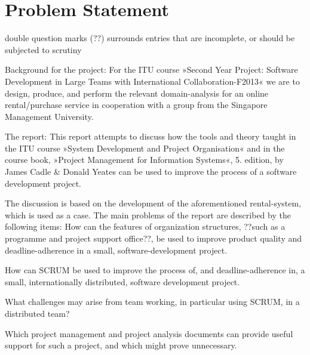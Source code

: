 \section{Problem Statement}
\label{sec:problemstatement}
double question marks (??) surrounds entries that are incomplete, or should be
subjected to scrutiny

Background for the project:
For the ITU course »Second Year Project: Software Development in Large Teams with
International Collaboration-F2013«
we are to design, produce, and perform the relevant domain-analysis for
an online rental/purchase service in cooperation with a group from the Singapore
Management University.

The report:
This report attempts to discuss how the tools and theory taught in the
ITU course »System Development and Project Organisation« and in the
course book, »Project Management for Information Systems«, 5. edition, by 
James Cadle \& Donald Yeates can be used to improve the process of a software development project.

The discussion is based on the development of the aforementioned
rental-system, which is used as a case.
The main problems of the report are described by the following items:
How can the features of organization structures, ??such as a
programme and project support office??, be used to improve
product quality and deadline-adherence in a small,
software-development project.

How can SCRUM be used to improve the process of, and 
deadline-adherence in, a small, internationally distributed,
software development project.

What challenges may arise from team working, in particular
using SCRUM, in a distributed team?

Which project management and project analysis documents can
provide useful support for such a project, and which might
prove unnecessary.
